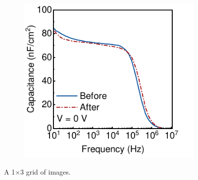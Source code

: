 \begin{figure}[htbp]
\begin{subfigure}{0.32\textwidth}
        \caption{}
        \label{}
    \end{subfigure}
    \hfill
        \begin{subfigure}{0.33\textwidth}
        \centering
        \includegraphics[width=\textwidth]{chapters/transport_layers/images/IS_Before_After.pdf}
        \caption{}
        \label{}
    \end{subfigure}
    
    \caption{A 1×3 grid of images.}
    \label{}
\end{figure}


